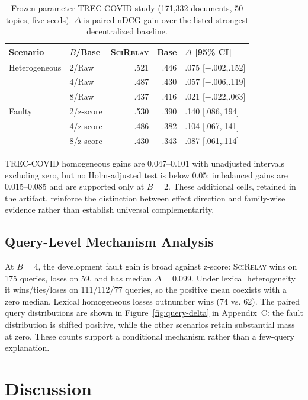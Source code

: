 \documentclass[sigconf]{acmart}
\newcommand{\method}{\textsc{SciRelay}}
\newcommand{\ndcg}{nDCG}
\begin{document}
\begin{table}[t]
\caption{Frozen-parameter TREC-COVID study (171,332 documents, 50 topics, five seeds). $\Delta$ is paired \ndcg{} gain over the listed strongest decentralized baseline.}
\label{tab:external}
\scriptsize
\setlength{\tabcolsep}{2.6pt}
\begin{tabular}{llrrl}
\toprule
Scenario & $B$/Base & \method{} & Base & $\Delta$ [95\% CI] \\
\midrule
Heterogeneous & 2/Raw & .521 & .446 & .075 [$-.002$,.152] \\
 & 4/Raw & .487 & .430 & .057 [$-.006$,.119] \\
 & 8/Raw & .437 & .416 & .021 [$-.022$,.063] \\
Faulty & 2/z-score & .530 & .390 & .140 [.086,.194] \\
 & 4/z-score & .486 & .382 & .104 [.067,.141] \\
 & 8/z-score & .430 & .343 & .087 [.061,.114] \\
\bottomrule
\end{tabular}
\end{table}

TREC-COVID homogeneous gains are 0.047--0.101 with unadjusted intervals excluding zero, but no Holm-adjusted test is below 0.05; imbalanced gains are 0.015--0.085 and are supported only at $B=2$. These additional cells, retained in the artifact, reinforce the distinction between effect direction and family-wise evidence rather than establish universal complementarity.

\subsection{Query-Level Mechanism Analysis}

At $B=4$, the development fault gain is broad against z-score: \method{} wins on 175 queries, loses on 59, and has median $\Delta=0.099$. Under lexical heterogeneity it wins/ties/loses on 111/112/77 queries, so the positive mean coexists with a zero median. Lexical homogeneous losses outnumber wins (74 vs. 62). The paired query distributions are shown in Figure~\ref{fig:query-delta} in Appendix~C: the fault distribution is shifted positive, while the other scenarios retain substantial mass at zero. These counts support a conditional mechanism rather than a few-query explanation.

\section{Discussion}
\end{document}
